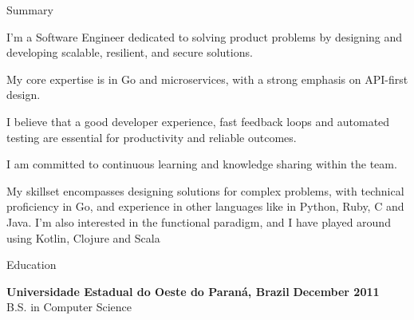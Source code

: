 \documentclass[
	a4paper, %
	10pt, %
]{resume} %
\begin{document}

\begin{rSection}{Summary}

I'm a Software Engineer dedicated to solving product problems by designing and developing scalable, resilient, and secure solutions.

My core expertise is in Go and microservices, with a strong emphasis on API-first design.

I believe that a good developer experience, fast feedback loops and automated testing are essential for productivity and reliable outcomes.

I am committed to continuous learning and knowledge sharing within the team.

My skillset encompasses designing solutions for complex problems, with technical proficiency in Go, and experience in other languages like in Python, Ruby, C and Java.
I'm also interested in the functional paradigm, and I have played around using Kotlin, Clojure and Scala

\end{rSection}


\begin{rSection}{Education}

	\textbf{Universidade Estadual do Oeste do Paraná, Brazil} \hfill \textbf{December 2011} \\
	B.S. in Computer Science

\end{rSection}


\end{document}
